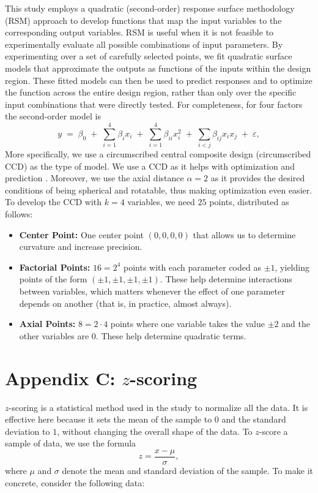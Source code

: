 \documentclass[12pt]{article}
\begin{document}
This study employs a quadratic (second-order) response surface methodology (RSM) approach to develop functions that map the input variables to the corresponding output variables. RSM is useful when it is not feasible to experimentally evaluate all possible combinations of input parameters. By experimenting over a set of carefully selected points, we fit quadratic surface models that approximate the outputs as functions of the inputs within the design region. These fitted models can then be used to predict responses and to optimize the function across the entire design region, rather than only over the specific input combinations that were directly tested. For completeness, for four factors the second-order model is
\begin{equation}
    y \;=\; \beta_0 \;+\; \sum_{i=1}^{4}\beta_i x_i \;+\; \sum_{i=1}^{4}\beta_{ii}x_i^2 \;+\; \sum_{i<j}\beta_{ij}x_ix_j \;+\; \varepsilon,
    \label{eq:second_order}
\end{equation}
More specifically, we use a circumscribed central composite design (circumscribed CCD) as the type of model. We use a CCD as it helps with optimization and prediction \cite{jmp_ccd}. Moreover, we use the axial distance $\alpha = 2$ as it provides the desired conditions of being spherical and rotatable, thus making optimization even easier. To develop the CCD with $k=4$ variables, we need $25$ points, distributed as follows:
\begin{itemize}
    \item \textbf{Center Point:} One center point $(0,0,0,0)$ that allows us to determine curvature and increase precision.
    \item \textbf{Factorial Points:} $16 = 2^4$ points with each parameter coded as $\pm 1$, yielding points of the form $(\pm 1, \pm1 , \pm 1, \pm 1)$. These help determine interactions between variables, which matters whenever the effect of one parameter depends on another (that is, in practice, almost always).
    \item \textbf{Axial Points:} $8 = 2\cdot 4$ points where one variable takes the value $\pm 2$ and the other variables are $0$. These help determine quadratic terms.
\end{itemize}


\section{Appendix C: $z$-scoring}

$z$-scoring is a statistical method used in the study to normalize all the data. It is effective here because it sets the mean of the sample to $0$ and the standard deviation to $1$, without changing the overall shape of the data. To $z$-score a sample of data, we use the formula
\[z = \frac{x-\mu}{\sigma},\] where $\mu$ and $\sigma$ denote the mean and standard deviation of the sample. To make it concrete, consider the following data:
\end{document}
